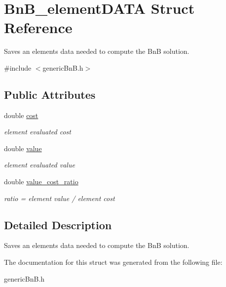 \hypertarget{struct_bn_b__element_d_a_t_a}{}\section{Bn\+B\+\_\+element\+D\+A\+T\+A Struct Reference}
\label{struct_bn_b__element_d_a_t_a}


Saves an element\textquotesingle{}s data needed to compute the Bn\+B solution.  




{\ttfamily \#include $<$generic\+Bn\+B.\+h$>$}

\subsection*{Public Attributes}
\begin{DoxyCompactItemize}
\item 
\hypertarget{struct_bn_b__element_d_a_t_a_ad2924da6deff21e31ced39f3e5aae097}{}double \hyperlink{struct_bn_b__element_d_a_t_a_ad2924da6deff21e31ced39f3e5aae097}{cost}\label{struct_bn_b__element_d_a_t_a_ad2924da6deff21e31ced39f3e5aae097}

\begin{DoxyCompactList}\small\item\em element evaluated cost \end{DoxyCompactList}\item 
\hypertarget{struct_bn_b__element_d_a_t_a_a87d3d0845c9aaa362ce98e34f329dde9}{}double \hyperlink{struct_bn_b__element_d_a_t_a_a87d3d0845c9aaa362ce98e34f329dde9}{value}\label{struct_bn_b__element_d_a_t_a_a87d3d0845c9aaa362ce98e34f329dde9}

\begin{DoxyCompactList}\small\item\em element evaluated value \end{DoxyCompactList}\item 
\hypertarget{struct_bn_b__element_d_a_t_a_af80eb28f770d18ac07957be349c2c971}{}double \hyperlink{struct_bn_b__element_d_a_t_a_af80eb28f770d18ac07957be349c2c971}{value\+\_\+cost\+\_\+ratio}\label{struct_bn_b__element_d_a_t_a_af80eb28f770d18ac07957be349c2c971}

\begin{DoxyCompactList}\small\item\em ratio = element value / element cost \end{DoxyCompactList}\end{DoxyCompactItemize}


\subsection{Detailed Description}
Saves an element\textquotesingle{}s data needed to compute the Bn\+B solution. 

The documentation for this struct was generated from the following file\+:\begin{DoxyCompactItemize}
\item 
generic\+Bn\+B.\+h\end{DoxyCompactItemize}
